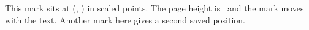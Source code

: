 \documentclass{article}
\begin{document}
This mark sits at (, ) in scaled points.
The page height is \the\pdfpageheight\ and the mark moves with the text.
Another mark here gives a second saved position.
\end{document}
